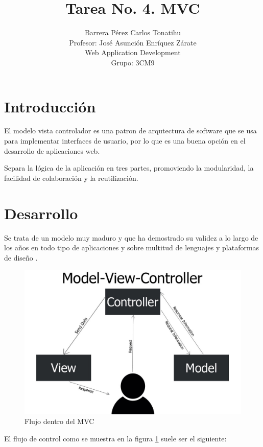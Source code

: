 \documentclass[a4paper,12pt]{article}
\title{Tarea No. 4. MVC}
\author{Barrera Pérez Carlos Tonatihu \\ Profesor: José Asunción Enríquez Zárate 
\\ Web Application Development \\ Grupo: 3CM9 }
\begin{document}
\maketitle
\newpage
\tableofcontents

\newpage
\section{Introducción}
El modelo vista controlador es una patron de arqutectura de 
software que se usa para implementar interfaces de usuario, por lo 
que es una buena opción en el desarrollo de aplicaciones web.

Separa la lógica de la aplicación en tres partes, promoviendo la 
modularidad, la facilidad de colaboración y la reutilización.\cite{firefox}

\section{Desarrollo}
Se trata de un modelo muy maduro y que ha demostrado su validez a lo largo de 
los años en todo tipo de aplicaciones y sobre multitud de lenguajes y 
plataformas de diseño \cite{uni}.

\begin{figure}[H]
\begin{center}
 \includegraphics[width=12cm]{modelo.jpg}
 \caption{Flujo dentro del MVC}
 \label{fig:control}
\end{center}
\end{figure}

El flujo de control como se muestra en la figura \ref{fig:control} suele ser el 
siguiente:
\end{document}
